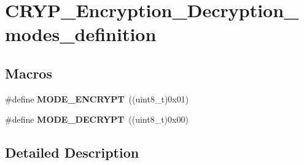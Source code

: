\hypertarget{group___c_r_y_p___encryption___decryption__modes__definition}{}\section{C\+R\+Y\+P\+\_\+\+Encryption\+\_\+\+Decryption\+\_\+modes\+\_\+definition}
\label{group___c_r_y_p___encryption___decryption__modes__definition}
\subsection*{Macros}
\begin{DoxyCompactItemize}
\item 
\hypertarget{group___c_r_y_p___encryption___decryption__modes__definition_ga34ad77e4aded75365ecfe2be34077891}{}\#define {\bfseries M\+O\+D\+E\+\_\+\+E\+N\+C\+R\+Y\+P\+T}~((uint8\+\_\+t)0x01)\label{group___c_r_y_p___encryption___decryption__modes__definition_ga34ad77e4aded75365ecfe2be34077891}

\item 
\hypertarget{group___c_r_y_p___encryption___decryption__modes__definition_gad455c2c9a98406dfbde2635483da69a6}{}\#define {\bfseries M\+O\+D\+E\+\_\+\+D\+E\+C\+R\+Y\+P\+T}~((uint8\+\_\+t)0x00)\label{group___c_r_y_p___encryption___decryption__modes__definition_gad455c2c9a98406dfbde2635483da69a6}

\end{DoxyCompactItemize}


\subsection{Detailed Description}
